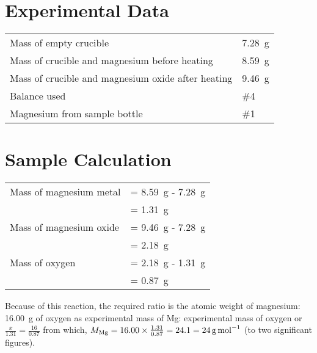 \documentclass{article}
\begin{document}

\section{Experimental Data}

\begin{tabular}{ll}
    Mass of empty crucible                             & \SI{7.28}{\gram} \\
    Mass of crucible and magnesium before heating      & \SI{8.59}{\gram} \\
    Mass of crucible and magnesium oxide after heating & \SI{9.46}{\gram} \\
    Balance used                                       & \#4              \\
    Magnesium from sample bottle                       & \#1
\end{tabular}


\section{Sample Calculation}

\begin{tabular}{ll}
    Mass of magnesium metal & = \SI{8.59}{\gram} - \SI{7.28}{\gram} \\
                            & = \SI{1.31}{\gram}                    \\
    Mass of magnesium oxide & = \SI{9.46}{\gram} - \SI{7.28}{\gram} \\
                            & = \SI{2.18}{\gram}                    \\
    Mass of oxygen          & = \SI{2.18}{\gram} - \SI{1.31}{\gram} \\
                            & = \SI{0.87}{\gram}
\end{tabular}

Because of this reaction, the required ratio is the atomic weight of magnesium: \SI{16.00}{\gram} of oxygen as experimental mass of Mg: experimental mass of oxygen or $\frac{x}{1.31}=\frac{16}{0.87}$ from which, $M_{\ce{Mg}} = 16.00 \times \frac{1.31}{0.87} = 24.1 = \SI{24}{\gram\per\mole}$ (to two significant figures).
\end{document}
